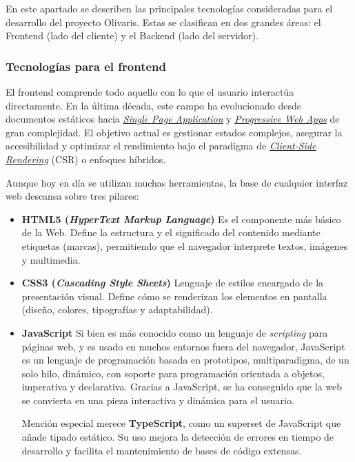 En este apartado se describen las principales tecnologías consideradas para el desarrollo del proyecto Olivaris. 
Estas se clasifican en dos grandes áreas: el Frontend (lado del cliente) y el Backend (lado del servidor).

\subsubsection{Tecnologías para el frontend}

El frontend comprende todo aquello con lo que el usuario interactúa directamente. En la última década, este campo ha 
evolucionado desde documentos estáticos hacia \hyperlink{singlePageApplication}{\textit{Single Page Application}} y 
\hyperlink{progressiveWebApps}{\textit{Progressive Web Apps}} de gran complejidad. El objetivo actual es gestionar 
estados complejos, asegurar la accesibilidad y optimizar el rendimiento bajo el paradigma de \hyperlink{clientSideRendering}{\textit{Client-Side Rendering}}  
(CSR) o enfoques híbridos.

Aunque hoy en día se utilizan muchas herramientas, la base de cualquier interfaz web descansa sobre tres pilares:

\begin{itemize}
    \item \textbf{HTML5 (\textit{HyperText Markup Language})} \cite{html}
    \newline
    Es el componente más básico de la Web. Define la estructura y el significado del contenido mediante etiquetas 
    (marcas), permitiendo que el navegador interprete textos, imágenes y multimedia.

    \item \textbf{CSS3 (\textit{Cascading Style Sheets})} \cite{css}
    \newline
    Lenguaje de estilos encargado de la presentación visual. Define cómo se renderizan los elementos en pantalla 
    (diseño, colores, tipografías y adaptabilidad).

    \item \textbf{JavaScript} \cite{javascript}
    \newline
    Si bien es más conocido como un lenguaje de \textit{scripting} para páginas web, y es usado en muchos entornos 
    fuera del navegador, JavaScript es un lenguaje de programación basada en prototipos, multiparadigma, de un solo 
    hilo, dinámico, con soporte para programación orientada a objetos, imperativa y declarativa. Gracias a JavaScript, se
    ha conseguido que la web se convierta en una pieza interactiva y dinámica para el usuario.

    Mención especial merece \textbf{TypeScript}, como un superset de JavaScript que añade tipado estático. Su uso 
    mejora la detección de errores en tiempo de desarrollo y facilita el mantenimiento de bases de código extensas.
\end{itemize}

